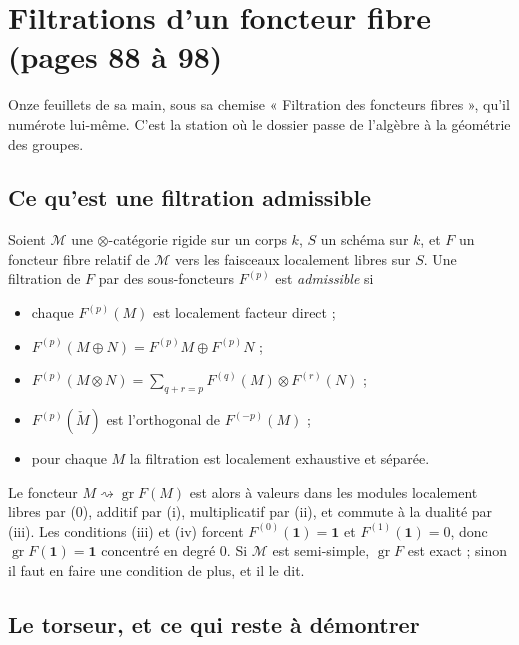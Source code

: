 \documentclass[11pt,a4paper]{article}
\begin{document}
\section*{Filtrations d'un foncteur fibre (pages 88 à 98)}

Onze feuillets de sa main, sous sa chemise « Filtration des foncteurs fibres »,
qu'il numérote lui-même. C'est la station où le dossier passe de
l'algèbre à la géométrie des groupes.

\subsection*{Ce qu'est une filtration admissible}

Soient $\mathcal{M}$ une $\otimes$-catégorie rigide sur un corps $k$, $S$ un
schéma sur $k$, et $F$ un foncteur fibre relatif de $\mathcal{M}$ vers les
faisceaux localement libres sur $S$. Une filtration de $F$ par des
sous-foncteurs $F^{(p)}$ est \emph{admissible} si
\begin{itemize}
\item[(0)] chaque $F^{(p)}(M)$ est localement facteur direct ;
\item[(i)] $F^{(p)}(M \oplus N) = F^{(p)}M \oplus F^{(p)}N$ ;
\item[(ii)] $F^{(p)}(M \otimes N) = \sum_{q+r=p} F^{(q)}(M) \otimes F^{(r)}(N)$ ;
\item[(iii)] $F^{(p)}(\check{M})$ est l'orthogonal de $F^{(-p)}(M)$ ;
\item[(iv)] pour chaque $M$ la filtration est localement exhaustive et
séparée.
\end{itemize}
Le foncteur $M \rightsquigarrow \operatorname{gr}F(M)$ est alors à valeurs dans
les modules localement libres par (0), additif par (i), multiplicatif par (ii),
et commute à la dualité par (iii). Les conditions (iii) et (iv) forcent
$F^{(0)}(\mathbf{1}) = \mathbf{1}$ et $F^{(1)}(\mathbf{1}) = 0$, donc
$\operatorname{gr}F(\mathbf{1}) = \mathbf{1}$ concentré en degré $0$. Si
$\mathcal{M}$ est semi-simple, $\operatorname{gr}F$ est exact ; sinon il faut
en faire une condition de plus, et il le dit.

\subsection*{Le torseur, et ce qui reste à démontrer}
\end{document}

